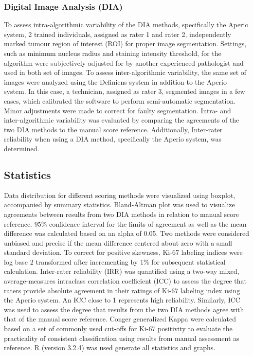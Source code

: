 \documentclass[final,5p,times,twocolumn]{elsarticle}
\begin{document}
\subsubsection*{Digital Image Analysis (DIA)}
To assess intra-algorithmic variability of the DIA methods, specifically the Aperio system, 2 trained individuals, assigned as rater 1 and rater 2, independently marked tumour region of interest (ROI) for proper image segmentation. Settings, such as minimum nucleus radius and staining intensity threshold, for the algorithm were subjectively adjusted for by another experienced pathologist and used in both set of images. To assess inter-algorithmic variability, the same set of images were analyzed using the Definiens system in addition to the Aperio system. In this case, a technician, assigned as rater 3, segmented images in a few cases, which calibrated the software to perform semi-automatic segmentation. Minor adjustments were made to correct for faulty segmentation. Intra- and inter-algorithmic variability was evaluated by comparing the agreements of the two DIA methods to the manual score reference. Additionally, Inter-rater reliability when using a DIA method, specifically the Aperio system, was determined.

\subsection*{Statistics}
Data distribution for different scoring methods were visualized using boxplot, accompanied by summary statistics. Bland-Altman plot was used to visualize agreements between results from two DIA methods in relation to manual score reference. \cite{Bland1986} 95\% confidence interval for the limits of agreement as well as the mean difference was calculated based on an alpha of 0.05. Two methods were considered unbiased and precise if the mean difference centered about zero with a small standard deviation. \cite{Hanneman2008} To correct for positive skewness, Ki-67 labeling indices were log base 2 transformed after incrementing by 1\% for subsequent statistical calculation. Inter-rater reliability (IRR) was quantified using a two-way mixed, average-measures intraclass correlation coefficient (ICC) to assess the degree that raters provide absolute agreement in their ratings of Ki-67 labeling index using the Aperio system. \cite{Shrout1979} An ICC close to 1 represents high reliability. Similarly, ICC was used to assess the degree that results from the two DIA methods agree with that of the manual score reference. Conger generalized Kappa were calculated based on a set of commonly used cut-offs for Ki-67 positivity to evaluate the practicality of consistent classification using results from manual assessment as reference. \cite{Conger1980} R (version 3.2.4) was used generate all statistics and graphs.
\end{document}
